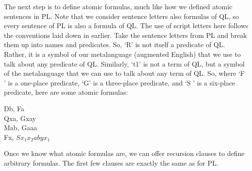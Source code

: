 The next step is to define atomic formulas, much like how we defined atomic sentences in PL.
Note that we consider sentence letters also formulas of QL, so every sentence of PL is also a formula of QL. The use of script letters here follows the conventions laid down in earlier. Take the sentence letters from PL and break them up into names and predicates. So, ‘R’ is not itself a predicate of QL. Rather, it is a symbol of our metalanguage (augmented English) that we use to talk about any predicate of QL. Similarly, ‘t1’ is not a term of QL, but a symbol of the metalanguage that we can use to talk about any term of QL. So, where ‘F ’ is a one-place predicate, ‘G’ is a three-place predicate, and ‘S ’ is a six-place predicate, here are some atomic formulas:
\begin{center}
Db, Fa\\
Qxa, Gxay\\
Mab, Gaaa\\
Fx, $Sx_{1}x_{2}abyx_{1}$
\end{center}

Once we know what atomic formulas are, we can offer recursion clauses to define arbitrary formulas. The first few clauses are exactly the same as for PL.


